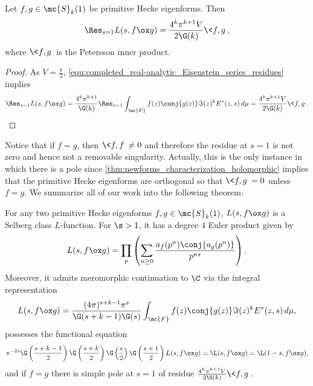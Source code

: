       \begin{proposition}
        Let $f,g \in \mc{S}_{k}(1)$ be primitive Hecke eigenforms. Then
        \[
          \Res_{s = 1}L(s,f \ox g) = \frac{4^{k}\pi^{k+1}V}{2\G(k)}\<f,g\>,
        \]
        where $\<f,g\>$ is the Petersson inner product.
      \end{proposition}
      \begin{proof}
        As $V = \frac{\pi}{3}$, \cref{equ:completed_real-analytic_Eisenstein_series_residues} implies
        \[
          \Res_{s = 1}L(s,f \ox g) = \frac{4^{k}\pi^{k+1}}{\G(k)}\Res_{s = 1}\int_{\mc{F}}f(z)\conj{g(z)}\Im(z)^{k}E^{\ast}(z,s)\,d\mu = \frac{4^{k}\pi^{k+1}V}{2\G(k)}\<f,g\>.
        \]
      \end{proof}

      Notice that if $f = g$, then $\<f,f\> \neq 0$ and therefore the residue at $s = 1$ is not zero and hence not a removable singularity. Actually, this is the only instance in which there is a pole since \cref{thm:newforms_characterization_holomorphic} implies that the primitive Hecke eigenforms are orthogonal so that $\<f,g\> = 0$ unless $f = g$. We summarize all of our work into the following theorem:

      \begin{theorem}
        For any two primitive Hecke eigenforms $f,g \in \mc{S}_{k}(1)$, $L(s,f \ox g)$ is a Selberg class $L$-function. For $\s > 1$, it has a degree $4$ Euler product given by
        \[
          L(s,f \ox g) = \prod_{p}\left(\sum_{n \ge 0}\frac{a_{f}(p^{n})\conj{a_{g}(p^{n})}}{p^{ns}}\right).
        \]
        Moreover, it admits meromorphic continuation to $\C$ via the integral representation
        \[
          L(s,f \ox g) = \frac{(4\pi)^{s+k-1}\pi^{s}}{\G(s+k-1)\G(s)}\int_{\mc{F}}f(z)\conj{g(z)}\Im(z)^{k}E^{\ast}(z,s)\,d\mu,
        \]
        possesses the functional equation
        \[
          \pi^{-2s}\G\left(\frac{s+k-1}{2}\right)\G\left(\frac{s+k}{2}\right)\G\left(\frac{s}{2}\right)\G\left(\frac{s+1}{2}\right)L(s,f \ox g) = \L(s,f \ox g) = \L(1-s,f \ox g),
        \]
        and if $f = g$ there is simple pole at $s = 1$ of residue $\frac{4^{k}\pi^{k+1}V}{2\G(k)}\<f,g\>$.
      \end{theorem}
